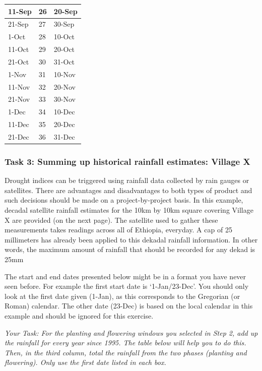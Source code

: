 \documentclass[letterpaper,10pt,english]{sphinxmanual}
\begin{document}
\begin{longtable}{|l|l|l|}
\\
\hline
11-Sep
 & 
26
 & 
20-Sep
\\
\hline
21-Sep
 & 
27
 & 
30-Sep
\\
\hline
1-Oct
 & 
28
 & 
10-Oct
\\
\hline
11-Oct
 & 
29
 & 
20-Oct
\\
\hline
21-Oct
 & 
30
 & 
31-Oct
\\
\hline
1-Nov
 & 
31
 & 
10-Nov
\\
\hline
11-Nov
 & 
32
 & 
20-Nov
\\
\hline
21-Nov
 & 
33
 & 
30-Nov
\\
\hline
1-Dec
 & 
34
 & 
10-Dec
\\
\hline
11-Dec
 & 
35
 & 
20-Dec
\\
\hline
21-Dec
 & 
36
 & 
31-Dec
\\
\hline\end{longtable}



\subsubsection{Task 3: Summing up historical rainfall estimates: Village X}
\label{whatisindexinsurance/designingindexbyhand:task-3-summing-up-historical-rainfall-estimates-village-x}
Drought indices can be triggered using rainfall data collected by rain gauges or satellites. There are advantages and disadvantages to both types of product and such decisions should be made on a project-by-project basis. In this example, decadal satellite rainfall estimates for the 10km by 10km square covering Village X are provided (on the next page). The satellite used to gather these measurements takes readings across all of Ethiopia, everyday. A cap of 25 millimeters has already been applied to this dekadal rainfall information. In other words, the maximum amount of rainfall that should be recorded for any dekad is 25mm

The start and end dates presented below might be in a format you have never seen before. For example the first start date is `1-Jan/23-Dec'. You should only look at the first date given (1-Jan), as this corresponds to the Gregorian (or Roman) calendar. The other date (23-Dec) is based on the local calendar in this example and should be ignored for this exercise.

\emph{Your Task: For the planting and flowering windows you selected in Step 2, add up the rainfall for every year since 1995. The table below will help you to do this. Then, in the third column, total the rainfall from the two phases (planting and flowering). Only use the first date listed in each box.}
\end{document}

